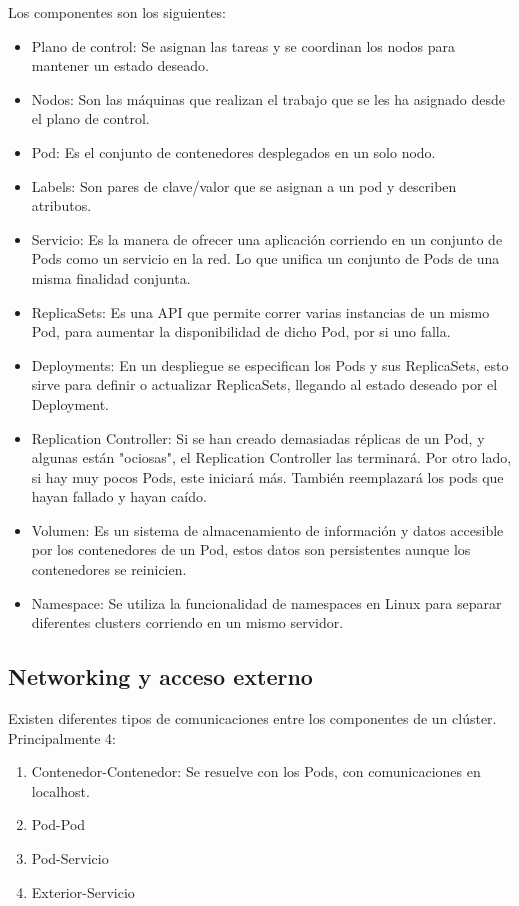 \documentclass[]{article}
\begin{document}
Los componentes son los siguientes:
\begin{itemize}
	\item Plano de control: Se asignan las tareas y se coordinan los nodos para mantener un estado deseado.
	\item Nodos: Son las máquinas que realizan el trabajo que se les ha asignado desde el plano de control.
	\item Pod: Es el conjunto de contenedores desplegados en un solo nodo. 
	\item Labels: Son pares de clave/valor que se asignan a un pod y describen atributos.
	\item Servicio: Es la manera de ofrecer una aplicación corriendo en un conjunto de Pods como un servicio en la red. Lo que unifica un conjunto de Pods de una misma finalidad conjunta.
	\item ReplicaSets: Es una API que permite correr varias instancias de un mismo Pod, para aumentar la disponibilidad de dicho Pod, por si uno falla.
	\item Deployments: En un despliegue se especifican los Pods y sus ReplicaSets, esto sirve para definir o actualizar ReplicaSets, llegando al estado deseado por el Deployment.
	\item Replication Controller: Si se han creado demasiadas réplicas de un Pod, y algunas están "ociosas", el Replication Controller las terminará. Por otro lado, si hay muy pocos Pods, este iniciará más. También reemplazará los pods que hayan fallado y hayan caído. 
	\item Volumen: Es un sistema de almacenamiento de información y datos accesible por los contenedores de un Pod, estos datos son persistentes aunque los contenedores se reinicien.
	\item Namespace: Se utiliza la funcionalidad de namespaces en Linux para separar diferentes clusters corriendo en un mismo servidor.
\end{itemize}

\subsection{Networking y acceso externo}

Existen diferentes tipos de comunicaciones entre los componentes de un clúster\cite{networking}. Principalmente 4:
\begin{enumerate}
	\item Contenedor-Contenedor: Se resuelve con los Pods, con comunicaciones en localhost.
	\item Pod-Pod
	\item Pod-Servicio
	\item Exterior-Servicio
\end{enumerate}
\end{document}
